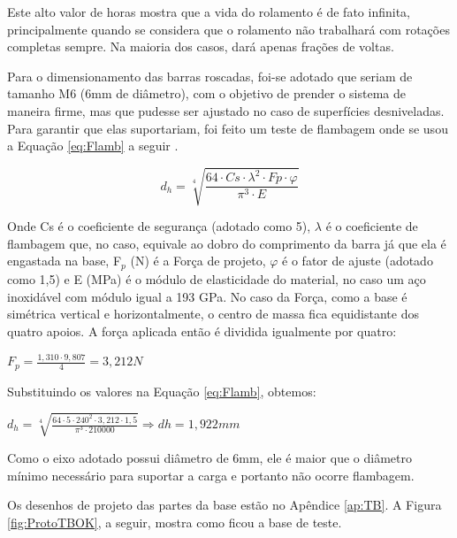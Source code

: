 \documentclass[
	12pt,				%
	openany,			%
	twoside,			%
	a4paper,			%
	english,			%
	french,				%
	spanish,			%
	brazil,				%
	oldfontcommands
	]{abntex2}
\begin{document}
Este alto valor de horas mostra que a vida do rolamento é de fato infinita, principalmente quando se considera que o rolamento não trabalhará com rotações completas sempre. Na maioria dos casos, dará apenas frações de voltas.

Para o dimensionamento das barras roscadas, foi-se adotado que seriam de tamanho M6 (6mm de diâmetro), com o objetivo de prender o sistema de maneira firme, mas que pudesse ser ajustado no caso de superfícies desniveladas. Para garantir que elas suportariam, foi feito um teste de flambagem onde se usou a Equação \ref{eq:Flamb} a seguir \cite{ProjMaq}.

\begin{equation}
d_{h} = \sqrt[4]{ \frac{64 \cdot Cs \cdot \lambda^{2} \cdot Fp \cdot \varphi }{ \pi^{3} \cdot E } }
\label{eq:Flamb}
\end{equation}

Onde Cs é o coeficiente de segurança (adotado como 5), $\lambda$ é o coeficiente de flambagem que, no caso, equivale ao dobro do comprimento da barra já que ela é engastada na base, F$_{p}$ (N) é a Força de projeto, $\varphi$ é o fator de ajuste (adotado como 1,5) e E (MPa) é o módulo de elasticidade do material, no caso um aço inoxidável com módulo igual a 193 GPa. No caso da Força, como a base é simétrica vertical e horizontalmente, o centro de massa fica equidistante dos quatro apoios. A força aplicada então é dividida igualmente por quatro:

\begin{center}
$F_{p} = \frac{1,310 \cdot 9,807}{4} = 3,212 N$
\end{center}

Substituindo os valores na Equação \ref{eq:Flamb}, obtemos:

\begin{center}
$d_{h} = \sqrt[4]{ \frac{64 \cdot 5 \cdot 240^{2} \cdot 3,212 \cdot 1,5 }{ \pi^{3} \cdot 210000 } } \Longrightarrow dh = 1,922 mm$
\end{center}

Como o eixo adotado possui diâmetro de 6mm, ele é maior que o diâmetro mínimo necessário para suportar a carga e portanto não ocorre flambagem.

Os desenhos de projeto das partes da base estão no Apêndice \ref{ap:TB}. A Figura \ref{fig:ProtoTBOK}, a seguir, mostra como ficou a base de teste.
\end{document}
